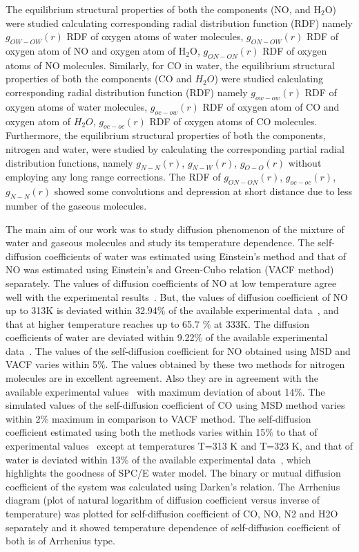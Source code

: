 The equilibrium structural properties of both the components (NO, and H$_\mathrm{2}$O) were studied calculating corresponding radial distribution function (RDF) namely $g_{OW-OW}(r)$ RDF of oxygen atoms of water molecules, $g_{ON-OW}(r)$ RDF of oxygen atom of NO and oxygen atom of H$_\mathrm{2}$O, $g_{ON-ON}(r)$ RDF of oxygen atoms of NO molecules. Similarly, for CO in water, the equilibrium structural properties of both the components (CO and $H_2 O$) were studied calculating corresponding radial distribution function (RDF) namely $g_{ow-ow}(r)$ RDF of oxygen atoms of water molecules, $g_{oc-ow}(r)$ RDF of oxygen atom of CO and oxygen atom of $H_2 O$, $g_{oc-oc}(r)$ RDF of oxygen atoms of CO molecules. Furthermore, the equilibrium structural properties of both the components, nitrogen and water, were studied by calculating the corresponding partial radial distribution functions, namely $g_{N-N}(r)$, $g_{N-W}(r)$, $g_{O-O}(r)$  without employing any long range corrections. The RDF of $g_{ON-ON}(r)$, $g_{oc-oc}(r)$, $g_{N-N}(r)$  showed some convolutions and depression at short distance due to less number of the gaseous molecules.

 The main aim of our work was to study diffusion phenomenon of the mixture of water and gaseous molecules and study its temperature dependence. The self-diffusion coefficients of water was estimated using Einstein's method and that of NO was estimated using Einstein's and Green-Cubo relation (VACF method) separately. The values of diffusion coefficients of NO at low temperature agree well with the experimental results~\citep{zacharia2005diffusivity}. But, the  values of diffusion coefficient of NO up to 313K is deviated within 32.94$\%$ of the available experimental data~\citep{wise1968diffusion}, and that at higher temperature reaches up to 65.7 $\%$ at 333K. The diffusion coefficients of water are deviated within 9.22$\%$ of the available experimental data~\citep{easteal1989diaphragm}. The values of the self-diffusion coefficient for NO obtained using MSD and VACF varies within 5$\%$.  The values obtained by these two methods for nitrogen molecules are in excellent agreement. Also they are in agreement with the available experimental values~\citep{verhallen1984diffusion, ferrell1967diffusion} with  maximum deviation of about 14\%.  The simulated values of the
 self-diffusion coefficient of CO using MSD method varies within 2\% maximum
 in comparison to VACF method. The self-diffusion coefficient estimated using
 both the methods varies within 15\% to that of experimental values~\citep{wise1968diffusion} except
 at temperatures T=313 K and T=323 K, and that of water is deviated within
 13\% of the available experimental data~\citep{easteal1989diaphragm,mills1973self}, which highlights the goodness  of SPC/E water model. The binary or mutual diffusion coefficient of the system
 was calculated using Darken's relation. The Arrhenius diagram (plot of natural
 logarithm of diffusion coefficient versus inverse of temperature) was plotted for
 self-diffusion coefficient of CO, NO, N2 and H2O separately and it showed temperature dependence of self-diffusion coefficient of both is of Arrhenius type. 
  
